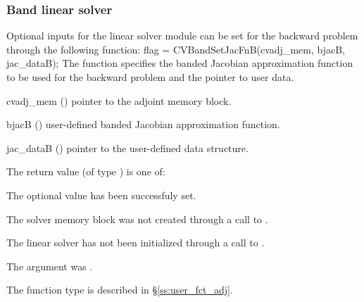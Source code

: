 \subsubsection{Band linear solver}
Optional inputs for the {\cvband} linear solver module can be set for the backward
problem through the following function:
{
  flag = CVBandSetJacFnB(cvadj\_mem, bjacB, jac\_dataB);
}
{
  The function  specifies the banded Jacobian
  approximation function to be used for the backward problem and the
  pointer to user data.
}
{
  \begin{args}
  \item[cvadj\_mem] ()
    pointer to the adjoint memory block.
  \item[bjacB] ()
    user-defined banded Jacobian approximation function.
  \item[jac\_dataB] ()
    pointer to the user-defined data structure.
  \end{args}
}
{
  The return value  (of type ) is one of:
  \begin{args}
  \item[\Id{CVBAND\_SUCCESS}] 
    The optional value has been successfuly set.
  \item[\Id{CVBAND\_MEM\_NULL}]
    The {\cvodes} solver memory block was not created through a call to .
  \item[\Id{CVBAND\_LMEM\_NULL}]
    The {\cvband} linear solver has not been initialized through a call to .
  \item[\Id{CVBAND\_ADJMEM\_NULL}]
    The  argument was .
  \end{args}
}
{
  The function type  is described in \S\ref{ss:user_fct_adj}.
}

